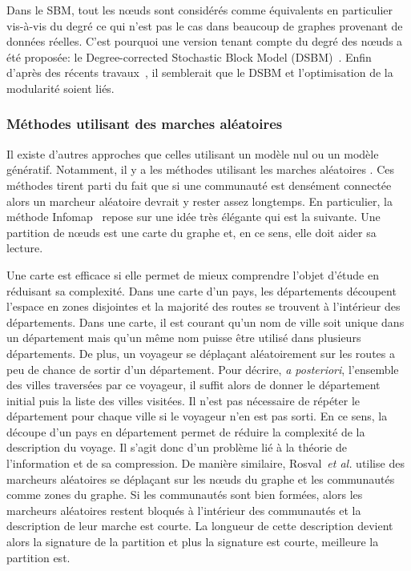 Dans le SBM, tout les n\oe{}uds sont considérés comme équivalents en particulier vis-à-vis du degré ce qui n'est pas le cas dans beaucoup de graphes provenant de données réelles.
C'est pourquoi une version tenant compte du degré des n\oe{}uds a été proposée: le Degree-corrected Stochastic Block Model (DSBM)~\cite{Karrer2011}.
Enfin d'après des récents travaux~\cite{Newman2016}, il semblerait que le DSBM et l'optimisation de la modularité soient liés.

\subsubsection{Méthodes utilisant des marches aléatoires}
Il existe d'autres approches que celles utilisant un modèle nul ou un modèle génératif.
Notamment, il y a les méthodes utilisant les marches aléatoires \cite{Pons2005,Rosvall2008}.
Ces méthodes tirent parti du fait que si une communauté est densément connectée alors un marcheur aléatoire devrait y rester assez longtemps.
En particulier, la méthode Infomap~\cite{Rosvall2008} repose sur une idée très élégante qui est la suivante.
Une partition de n\oe{}uds est une carte du graphe et, en ce sens, elle doit aider sa lecture.

Une carte est efficace si elle permet de mieux comprendre l'objet d'étude en réduisant sa complexité.
Dans une carte d'un pays, les départements découpent l'espace en zones disjointes et la majorité des routes se trouvent à l'intérieur des départements.
Dans une carte, il est courant qu'un nom de ville soit unique dans un département mais qu'un même nom puisse être utilisé dans plusieurs départements.
De plus, un voyageur se déplaçant aléatoirement sur les routes a peu de chance de sortir d'un département.
Pour décrire, \emph{a posteriori}, l'ensemble des villes traversées par ce voyageur, il suffit alors de donner le département initial puis la liste des villes visitées.
Il n'est pas nécessaire de répéter le département pour chaque ville si le voyageur n'en est pas sorti.
En ce sens, la découpe d'un pays en département permet de réduire la complexité de la description du voyage.
Il s'agit donc d'un problème lié à la théorie de l'information et de sa compression.
De manière similaire, Rosval~\emph{et al.} utilise des marcheurs aléatoires se déplaçant sur les n\oe{}uds du graphe et les communautés comme zones du graphe.
Si les communautés sont bien formées, alors les marcheurs aléatoires restent bloqués à l'intérieur des communautés et la description de leur marche est courte.
La longueur de cette description devient alors la signature de la partition et plus la signature est courte, meilleure la partition est.

